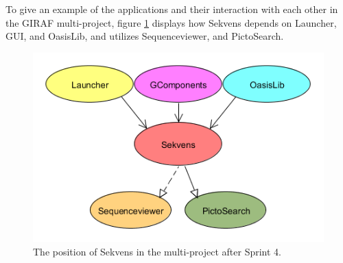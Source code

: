 To give an example of the applications and their interaction with each other in the GIRAF multi-project, figure \ref{fig:sekvensContext} displays how Sekvens depends on Launcher, GUI, and OasisLib, and utilizes Sequenceviewer, and PictoSearch.
\begin{figure}[H]
	\centering
	\includegraphics[scale=0.4]{Pics/sekvens.png}
	\caption{The position of Sekvens in the multi-project after Sprint 4.}
	\label{fig:sekvensContext}
\end{figure}
